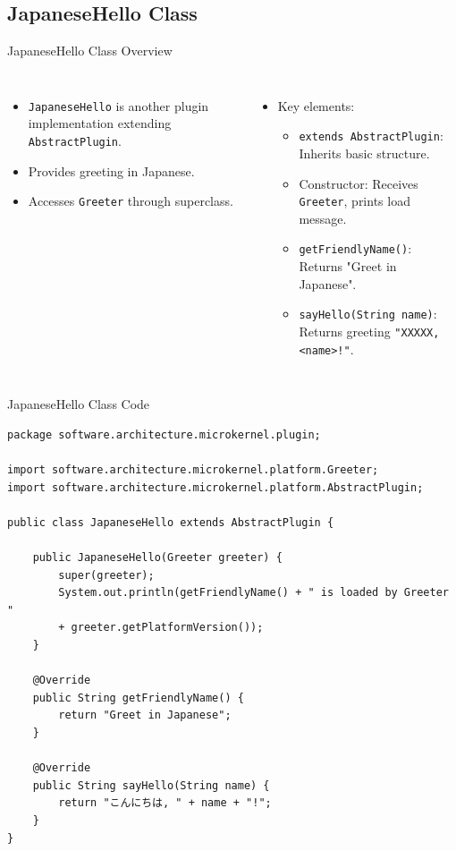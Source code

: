 \documentclass[aspectratio=169, table]{beamer}
\begin{document}
\subsection{JapaneseHello Class}

\begin{frame}{JapaneseHello Class Overview}
\vspace{20pt}
\begin{columns}[t]
\begin{itemize}
	\item \texttt{JapaneseHello} is another plugin implementation extending \texttt{AbstractPlugin}.
	\item Provides greeting in Japanese.
	\item Accesses \texttt{Greeter} through superclass.
\end{itemize}
\begin{itemize}
	\item Key elements:
	\begin{itemize}
		\item \texttt{extends AbstractPlugin}: Inherits basic structure.
		\item Constructor: Receives \texttt{Greeter}, prints load message.
		\item \texttt{getFriendlyName()}: Returns "Greet in Japanese".
		\item \texttt{sayHello(String name)}: Returns greeting \texttt{"XXXXX, <name>!"}.
	\end{itemize}
\end{itemize}
\end{columns}
\end{frame}

\begin{frame}[fragile]{JapaneseHello Class Code}
\vspace{20pt}
\begin{lstlisting}[style=JavaStyle, inputencoding=utf8, basicstyle=\tiny\ttfamily]
package software.architecture.microkernel.plugin;

import software.architecture.microkernel.platform.Greeter;
import software.architecture.microkernel.platform.AbstractPlugin;

public class JapaneseHello extends AbstractPlugin {
	
	public JapaneseHello(Greeter greeter) {
		super(greeter);
		System.out.println(getFriendlyName() + " is loaded by Greeter "
		+ greeter.getPlatformVersion());
	}
	
	@Override
	public String getFriendlyName() {
		return "Greet in Japanese";
	}
	
	@Override
	public String sayHello(String name) {
		return "こんにちは, " + name + "!";
	}
}
\end{lstlisting}
\end{frame}
\end{document}
